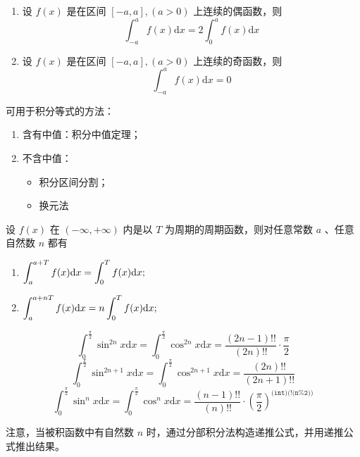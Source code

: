 
\begin{enumerate}
    \item 设 $ f(x) $ 是在区间 $ [-a,a],(a>0) $ 上连续的偶函数，则$$
        \int_{-a}^a f(x)\mathrm{d}x = 2 \int_0^a f(x)\mathrm{d}x
    $$ 
    \item 设 $ f(x) $ 是在区间 $ [-a,a],(a>0) $ 上连续的奇函数，则$$
        \int_{-a}^af(x)\mathrm{d}x = 0
    $$ 
\end{enumerate}

可用于积分等式的方法：
\begin{enumerate}
    \item 含有中值：积分中值定理；
    \item 不含中值：\begin{itemize}
        \item 积分区间分割；
        \item 换元法
    \end{itemize}
\end{enumerate}


设 $ f(x) $ 在 $ (-\infty,+\infty) $ 内是以 $ T $ 为周期的周期函数，则对任意常数 $ a $ 、任意自然数 $ n $ 
都有\begin{enumerate}
    \item $ \displaystyle \int_a^{a+T}f(x)\mathrm{d}x = \int_0^T f(x)\mathrm{d}x ; $
    \item $ \displaystyle \int_a^{a+nT}f(x)\mathrm{d}x = n\int_0^T f(x)\mathrm{d}x ; $
\end{enumerate}


\begin{Theo}

    $$
        \int_0^\frac{\pi}{2} \sin^{2n} x \mathrm{d} x = \int_0^\frac{\pi}{2} \cos^{2n} x \mathrm{d} x = 
        \dfrac{(2n-1)!!}{(2n)!!}\cdot \dfrac{\pi}{2}
    $$ 
    $$
        \int_0^\frac{\pi}{2} \sin^{2n+1} x \mathrm{d} x = \int_0^\frac{\pi}{2} \cos^{2n+1} x \mathrm{d} x = 
        \dfrac{(2n)!!}{(2n+1)!!}
    $$ 
    $$
        \int_0^\frac{\pi}{2} \sin^{n} x \mathrm{d} x = \int_0^\frac{\pi}{2} \cos^{n} x \mathrm{d} x = 
        \dfrac{(n-1)!!}{(n)!!}\cdot (\dfrac{\pi}{2})^\texttt{(int)(!(n\%2))}
    $$ 
\end{Theo}

注意，当被积函数中有自然数 $ n $ 时，通过分部积分法构造递推公式，并用递推公式推出结果。

